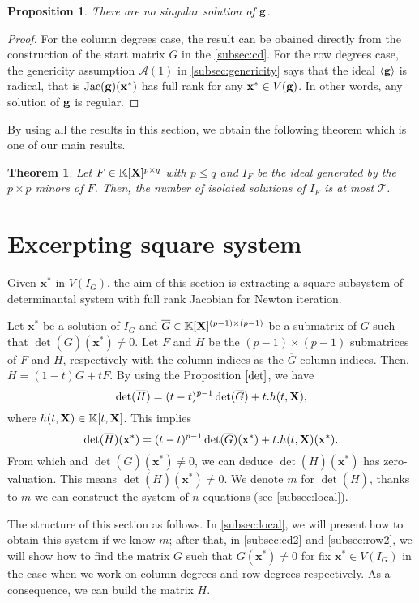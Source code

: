 \documentclass[11pt]{article}
\numberwithin{Property}{section}
\newtheorem{Theorem}{Theorem}%
\numberwithin{Theorem}{section}
\newtheorem{Proposition}{Proposition}%
\numberwithin{Proposition}{section}
\numberwithin{Lemma}{section}
\numberwithin{Corollary}{section}
\numberwithin{Definition}{section}
\numberwithin{Remark}{section}
\numberwithin{Conjecture}{section}
\numberwithin{Problem}{section}
\numberwithin{Claim}{section}
\theoremstyle{definition}
\numberwithin{Example}{section}
\renewcommand{\leq}{\leqslant}
\def\bar{\overline}
\newcommand{\field}{\mathbb{K}} %
\newcommand{\mat}[1]{\mathbf{\MakeUppercase{#1}}} %
\newcommand{\improve}[1]{\textcolor{blue}{#1}} %
\begin{document}
\begin{Proposition}
There are no singular solution of ${\bf g}$.
\end{Proposition}
\begin{proof}
For the column degrees case, the result can be obained directly from the construction of the start matrix $G$ in the \improve{\cref{subsec:cd}}. For the row degrees case, the genericity assumption $\mathcal{A}(1)$ in \improve{\cref{subsec:genericity}} says that the ideal $\langle {\bf g} \rangle$ is radical, that is $\mathrm{Jac}({\bf g})(\mathbf{x}^*)$ has full rank for any $\mathbf{x}^* \in V({\bf g})$. In other words, any solution of ${\bf g}$ is regular.  
\end{proof}
By using all the results in this section, we obtain the following theorem which is one of our main results.
\begin{Theorem}
Let $F \in \field[\mat{X}]^{p \times q}$ with $p \leq q$ and $I_F$ be the ideal generated by the $p \times p$ minors of $F$. Then, the number of isolated solutions of $I_F$ is at most $\mathcal{T}$. 
\end{Theorem}
\section{Excerpting square system}
\label{sec:extractsubsystem}
Given $\mathbf{x}^*$ in $V(I_G)$, the aim of this section is extracting a square subsystem of determinantal system with full rank Jacobian for Newton iteration. 

Let $\mathbf{x}^*$ be a solution of $I_G$ and $\bar{G} \in \field[\mat{X}]^{(p-1) \times (p-1)}$ be a submatrix of $G$ such that $\det(\bar{G})(\mathbf{x}^*) \ne 0$. Let $\bar{F}$ and $\bar{H}$ be the $(p-1) \times (p-1)$ submatrices of $F$ and $H$, respectively with the column indices as the $\bar{G}$ column indices. Then, $\bar{H} = (1-t)\bar{G} + t\bar{F}$. By using the Proposition $\ref{det}$, we have 
\[
\det(\bar{H}) = (t-t)^{p-1} \det(\bar{G}) + t.h(t,\mat{X}),
\] where $h(t,\mat{X}) \in \field[t,\mat{X}]$. This implies 
\[
\det(\bar{H})(\mathbf{x}^*) = (t-t)^{p-1} \det(\bar{G})(\mathbf{x}^*) + t.h(t,\mat{X})(\mathbf{x}^*). 
\] From which and $\det(\bar{G})(\mathbf{x}^*) \ne 0$, we can deduce $\det(\bar{H})(\mathbf{x}^*)$ has zero-valuation. This means $\det(\bar{H})(\mathbf{x}^*) \ne 0$. We denote $m$ for $\det(\bar{H})$, thanks to $m$ we can construct the system of $n$ equations (see \improve{\cref{subsec:local}}). 

The structure of this section as follows. In \improve{\cref{subsec:local}}, we will present how to obtain this system if we know $m$; after that, in \improve{\cref{subsec:cd2}} and \improve{\cref{subsec:row2}}, we will show how to find the matrix $\bar{G}$ such that $\bar{G}(\mathbf{x}^*) \ne 0$ for fix $\mathbf{x}^* \in V(I_G)$ in the case when we work on column degrees and row degrees respectively. As a consequence, we can build the matrix $\bar{H}$. 
\end{document}
